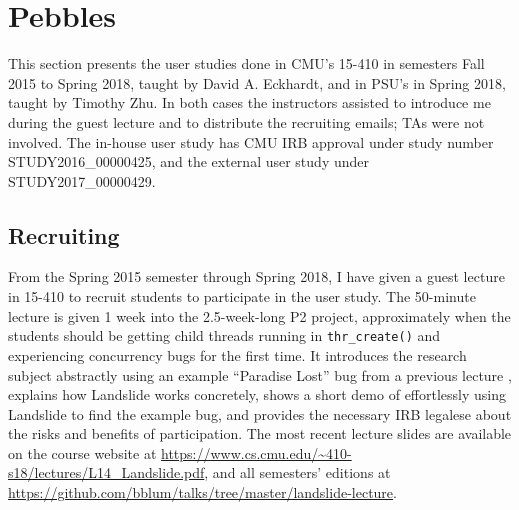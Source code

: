 
\section{Pebbles}

This section presents the user studies done in
CMU's 15-410 in semesters Fall 2015 to Spring 2018,
taught by David A. Eckhardt,
and in PSU's \psuos in Spring 2018,
taught by Timothy Zhu.
In both cases the instructors assisted to introduce me during the guest lecture
and to distribute the recruiting emails;
TAs were not involved.
The in-house user study has CMU IRB approval under study number STUDY2016\_00000425,
and the external user study under STUDY2017\_00000429.


\subsection{Recruiting}
\label{sec:education-pebbles-recruiting}

From the Spring 2015 semester through Spring 2018,
I have given a guest lecture in 15-410
to recruit students to participate in the user study.
The 50-minute lecture is given 1 week into the 2.5-week-long P2 project,
approximately when the students should be getting child threads running in {\tt thr\_create()}
and experiencing concurrency bugs for the first time.
It introduces the research subject abstractly
using an example ``Paradise Lost'' bug from a previous lecture \cite{paradise-lost},
explains how Landslide works concretely,
shows a short demo of effortlessly using Landslide to find the example bug,
and provides the necessary IRB legalese about the risks and benefits of participation.
The most recent lecture slides are available on the course website at
\url{https://www.cs.cmu.edu/~410-s18/lectures/L14_Landslide.pdf},
and all semesters' editions at
\url{https://github.com/bblum/talks/tree/master/landslide-lecture}.

